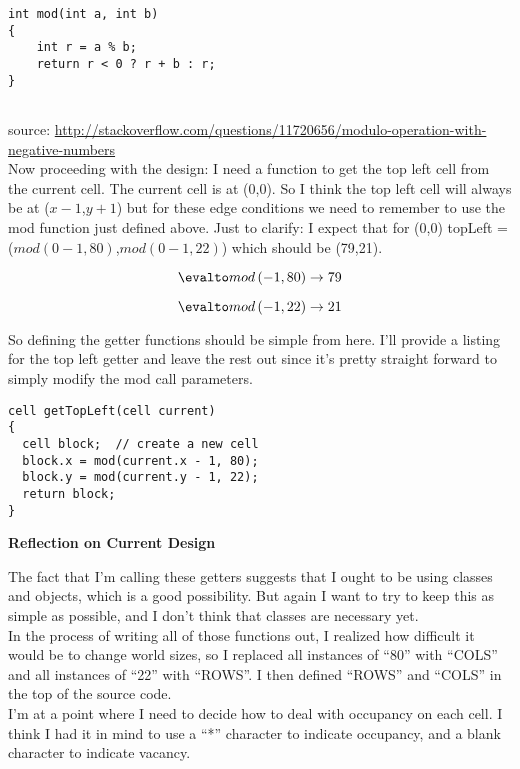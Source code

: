 \documentclass[11pt, oneside]{memoir}
\begin{document}
\begin{lstlisting}
int mod(int a, int b)
{
    int r = a % b;
    return r < 0 ? r + b : r;
}
  
\end{lstlisting}

source:
\url{http://stackoverflow.com/questions/11720656/modulo-operation-with-negative-numbers} \\


Now proceeding with the design:  I need a function to get the
top left cell from the current cell.  The current cell is at (0,0).
So I think the top left cell will always be at ($x-1$,$y+1$) but for
these edge conditions we need to remember to use the mod function just
defined above.  Just to clarify: I expect that for (0,0) topLeft =
($mod(0-1,80)$,$mod(0-1,22)$) which should be (79,21).


$$
\evalto mod\left( -1, 80 \right) \to 79
$$


$$
\evalto mod\left( -1, 22 \right) \to 21
$$

So defining the getter functions should be simple from here.  I'll
provide a listing for the top left getter and leave the rest out since
it's pretty straight forward to simply modify the mod call parameters.

\begin{lstlisting}
cell getTopLeft(cell current)
{
  cell block;  // create a new cell
  block.x = mod(current.x - 1, 80);
  block.y = mod(current.y - 1, 22);
  return block;
}  
\end{lstlisting}

\textbf{Reflection on Current Design}

The fact that I'm calling these getters suggests that I ought to be
using classes and objects, which is a good possibility.  But again I
want to try to keep this as simple as possible, and I don't think that
classes are necessary yet. \\

In the process of writing all of those functions out, I realized how
difficult it would be to change world sizes, so I replaced all
instances of ``80'' with ``COLS'' and all instances of ``22'' with
``ROWS''.  I then defined ``ROWS'' and ``COLS'' in the top of the
source code. \\

I'm at a point where I need to decide how to deal with occupancy
on each cell.  I think I had it in mind to use a ``*'' character to
indicate occupancy, and a blank character to indicate vacancy.  \\  
\end{document}
